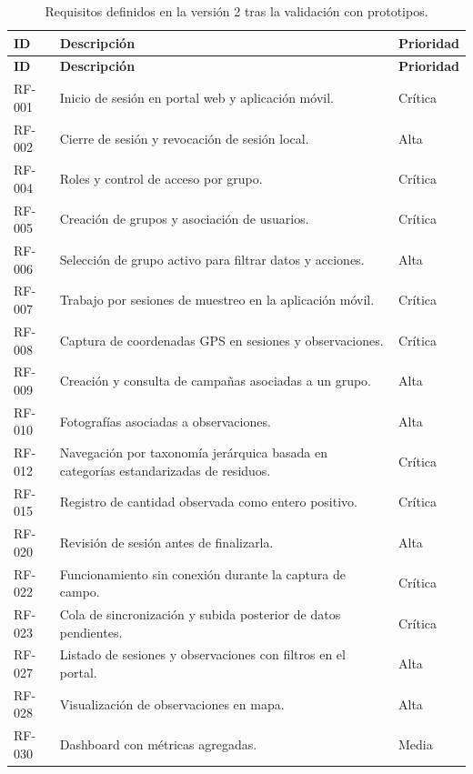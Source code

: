 {\small
\setlength{\tabcolsep}{4pt}
\renewcommand{\arraystretch}{1.08}
\begin{longtable}{>{\raggedright\arraybackslash}p{1.8cm} >{\raggedright\arraybackslash}p{10.1cm} >{\raggedright\arraybackslash}p{2.1cm}}
  \caption{Requisitos definidos en la versión 2 tras la validación con prototipos.}
  \label{tab:requisitos_v2} \\
  \toprule
  \textbf{ID} & \textbf{Descripción} & \textbf{Prioridad} \\
  \midrule
  \endfirsthead
  \toprule
  \textbf{ID} & \textbf{Descripción} & \textbf{Prioridad} \\
  \midrule
  \endhead
  RF-001 & Inicio de sesión en portal web y aplicación móvil. & Crítica \\
  RF-002 & Cierre de sesión y revocación de sesión local. & Alta \\
  RF-004 & Roles y control de acceso por grupo. & Crítica \\
  RF-005 & Creación de grupos y asociación de usuarios. & Crítica \\
  RF-006 & Selección de grupo activo para filtrar datos y acciones. & Alta \\
  RF-007 & Trabajo por sesiones de muestreo en la aplicación móvil. & Crítica \\
  RF-008 & Captura de coordenadas GPS en sesiones y observaciones. & Crítica \\
  RF-009 & Creación y consulta de campañas asociadas a un grupo. & Alta \\
  RF-010 & Fotografías asociadas a observaciones. & Alta \\
  RF-012 & Navegación por taxonomía jerárquica basada en categorías estandarizadas de residuos. & Crítica \\
  RF-015 & Registro de cantidad observada como entero positivo. & Crítica \\
  RF-020 & Revisión de sesión antes de finalizarla. & Alta \\
  RF-022 & Funcionamiento sin conexión durante la captura de campo. & Crítica \\
  RF-023 & Cola de sincronización y subida posterior de datos pendientes. & Crítica \\
  RF-027 & Listado de sesiones y observaciones con filtros en el portal. & Alta \\
  RF-028 & Visualización de observaciones en mapa. & Alta \\
  RF-030 & Dashboard con métricas agregadas. & Media \\

\end{longtable}}
